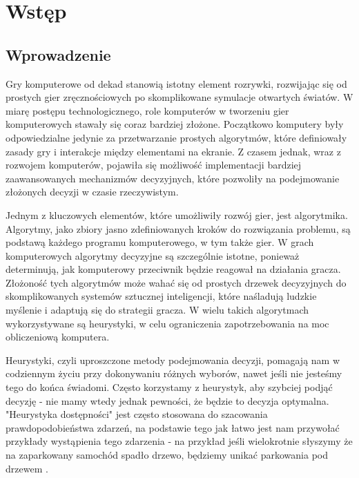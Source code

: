 \newpage %
\section{Wstęp}
\subsection{Wprowadzenie}
Gry komputerowe od dekad stanowią istotny element rozrywki, rozwijając się od prostych gier zręcznościowych po skomplikowane symulacje otwartych światów. W miarę postępu technologicznego, role komputerów w tworzeniu gier komputerowych stawały się coraz bardziej złożone. Początkowo komputery były odpowiedzialne jedynie za przetwarzanie prostych algorytmów, które definiowały zasady gry i interakcje między elementami na ekranie. Z czasem jednak, wraz z rozwojem komputerów, pojawiła się możliwość implementacji bardziej zaawansowanych mechanizmów decyzyjnych, które pozwoliły na podejmowanie złożonych decyzji w czasie rzeczywistym.

Jednym z kluczowych elementów, które umożliwiły rozwój gier, jest algorytmika. Algorytmy, jako zbiory jasno zdefiniowanych kroków do rozwiązania problemu, są podstawą każdego programu komputerowego, w tym także gier. W grach komputerowych algorytmy decyzyjne są szczególnie istotne, ponieważ determinują, jak komputerowy przeciwnik będzie reagował na działania gracza. Złożoność tych algorytmów może wahać się od prostych drzewek decyzyjnych do skomplikowanych systemów sztucznej inteligencji, które naśladują ludzkie myślenie i adaptują się do strategii gracza. W wielu takich algorytmach wykorzystywane są heurystyki, w celu ograniczenia zapotrzebowania na moc obliczeniową komputera.

\indent Heurystyki, czyli uproszczone metody podejmowania decyzji, pomagają nam w codziennym życiu przy dokonywaniu różnych wyborów, nawet jeśli nie jesteśmy tego do końca świadomi. Często korzystamy z heurystyk, aby szybciej podjąć decyzję - nie mamy wtedy jednak pewności, że będzie to decyzja optymalna. "Heurystyka dostępności" jest często stosowana do szacowania prawdopodobieństwa zdarzeń, na podstawie tego jak łatwo jest nam przywołać przykłady wystąpienia tego zdarzenia - na przykład jeśli wielokrotnie słyszymy że na zaparkowany samochód spadło drzewo, będziemy unikać parkowania pod drzewem \cite{tversky74}.

